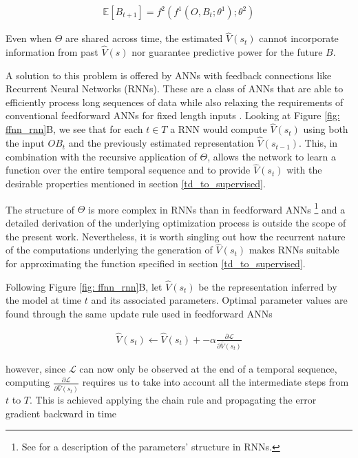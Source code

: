\begin{gather}
\label{td_ffnn}
    \mathbb{E}[B_{t+1}] = f^2(f^1(O, B_{t}; \theta^{1}); \theta^{2})
\end{gather}

Even when $\Theta$ are shared across time, the estimated $\widehat{V}(s_t)$ cannot incorporate information from past $\widehat{V}(s)$ nor guarantee predictive power for the future $B$. 

A solution to this problem is offered by ANNs with feedback connections like Recurrent Neural Networks (RNNs). These  are a class of ANNs that are able to efficiently process long sequences of data while also relaxing the requirements of conventional feedforward ANNs for fixed length inputs \cite{bengio2017deep}. Looking at Figure \ref{fig: ffnn_rnn}B, we see that for each $t \in T$ a RNN would compute $\widehat{V}(s_t)$ using both the input $OB_{t}$ and the previously estimated representation $\widehat{V}(s_{t-1})$. This, in combination with the recursive application of $\Theta$, allows the network to learn a function over the entire temporal sequence and to provide $\widehat{V}(s_t)$ with the desirable properties mentioned in section \ref{td_to_supervised}. 

The structure of $\Theta$ is more complex in RNNs than in feedforward ANNs \footnote{See \cite{bengio2017deep} for a description of the parameters' structure in RNNs.} and a detailed derivation of the underlying optimization process is outside the scope of the present work. Nevertheless, it is worth singling out how the recurrent nature of the computations underlying the generation of $\widehat{V}(s_t)$  makes RNNs suitable for approximating the function specified in section \ref{td_to_supervised}.

Following Figure \ref{fig: ffnn_rnn}B, let $\widehat{V}(s_t)$ be the representation inferred by the model at time $t$ and its associated parameters. Optimal parameter values are found through the same update rule used in feedforward ANNs

\begin{gather}
\label{bptt_1}
    \widehat{V}(s_t) \leftarrow \widehat{V}(s_t) + -\alpha \frac{\partial \mathcal{L}}{\partial \widehat{V}(s_t)}
\end{gather}

however, since $\mathcal{L}$ can now only be observed at the end of a temporal sequence, computing $\frac{\partial \mathcal{L}}{\partial \widehat{V}(s_t)}$ requires us to take into account all the intermediate steps from $t$ to $T$. This is achieved applying the chain rule and propagating the error gradient backward in time \cite{bengio2017deep,lillicrap2019backpropagation}

